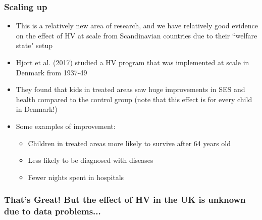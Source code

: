         \subsubsection {Scaling up}
        
            \begin{itemize}
                \item This is a relatively new area of research, and we have relatively good evidence on the effect of HV at scale from Scandinavian countries due to their ``welfare state" setup
                \item \href{https://www.aeaweb.org/articles?id=10.1257/app.20150087}{Hjort et al. (2017)} studied a HV program that was implemented at scale in Denmark from 1937-49
                \item They found that kids in treated areas saw huge improvements in SES and health compared to the control group (note that this effect is for every child in Denmark!)
                \item Some examples of improvement:
                \begin{itemize}
                    \item Children in treated areas more likely to survive after 64 years old
                    \item Less likely to be diagnosed with diseases
                    \item Fewer nights spent in hospitals
                \end{itemize}
            \end{itemize}
            
        \subsubsection{That's Great! But the effect of HV in the UK is unknown due to data problems...}
        
